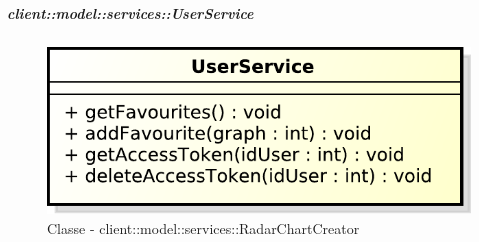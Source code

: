 		\subparagraph{client::model::services::UserService} %
		\label{subp:client_model_services_userservice}
		\begin{figure}[htbp]
				\centering
				\centerline{\includegraphics[scale=0.7]{./images/client/classes/model/user_service.pdf}}
				\caption{Classe - client::model::services::RadarChartCreator}
			\end{figure}
